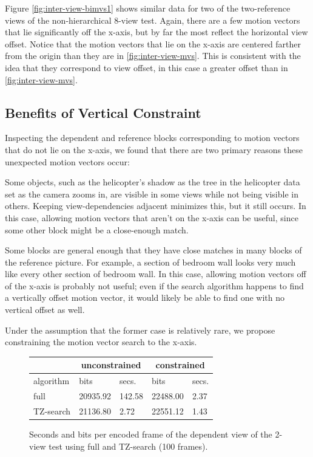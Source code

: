 \documentclass{sig-alternate-05-2015}
\begin{document}
Figure \ref{fig:inter-view-bimvs1} shows similar data for two of the
two-reference views of the non-hierarchical 8-view test. Again, there are a few
motion vectors that lie significantly off the x-axis, but by far the most reflect
the horizontal view offset. Notice that the motion vectors that lie on the x-axis
are centered farther from the origin than they are in \ref{fig:inter-view-mvs}.
This is consistent with the idea that they correspond to view offset, in this
case a greater offset than in \ref{fig:inter-view-mvs}.

\subsection{Benefits of Vertical Constraint}
\label{subsec:constrained}
Inspecting the dependent and reference blocks corresponding to motion vectors
that do not lie on the x-axis, we found that there are two primary reasons these
unexpected motion vectors occur: \begin{compactitem}
\item Some objects, such as the helicopter's shadow as the tree in the helicopter
data set as the camera zooms in, are visible in some views while not being visible
in others. Keeping view-dependencies adjacent minimizes this, but it still occurs.
In this case, allowing motion vectors that aren't on the x-axis can be useful,
since some other block might be a close-enough match.
\item Some blocks are general enough that they have close matches in many blocks
of the reference picture. For example, a section of bedroom wall looks very much
like every other section of bedroom wall. In this case, allowing motion vectors
off of the x-axis is probably not useful; even if the search algorithm happens
to find a vertically offset motion vector, it would likely be able to find one
with no vertical offset as well. \end{compactitem} Under the assumption that the
former case is relatively rare, we propose constraining the motion vector search
to the x-axis.

\begin{figure}[H]
\centering\small
\begin{tabular}{|l|l|l|l|l|}
\multicolumn{1}{c}{} & \multicolumn{2}{c}{unconstrained} & \multicolumn{2}{c}{constrained} \\ \hline
algorithm            & bits            & secs.           & bits            & secs.         \\ \hline
full                 & 20935.92        & 142.58          & 22488.00        & 2.37          \\ \hline
TZ-search            & 21136.80        & 2.72            & 22551.12        & 1.43          \\ \hline
\end{tabular}
\caption{Seconds and bits per encoded frame of the dependent view of the
2-view test using full and TZ-search (100 frames).}
\label{fig:time-full-fast}
\end{figure}
\end{document}
